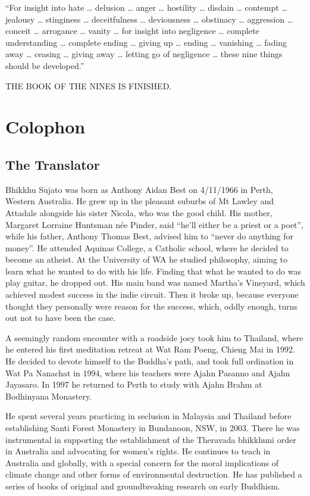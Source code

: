 \documentclass[12pt,openany]{book}%
\newcommand*{\scendbook}[1]{\begin{center}\uppercase{#1}\end{center}}
\let\oldbackmatter\backmatter
\renewcommand{\backmatter}{%
\chapterfont{\setstretch{.85}\normalfont\centering}%
\sectionfont{\setstretch{.85}\Semiboldsubheadfont}%
\oldbackmatter}
\begin{document}
“For insight into hate … delusion … anger … hostility … disdain … contempt … jealousy … stinginess … deceitfulness … deviousness … obstinacy … aggression … conceit … arrogance … vanity … for insight into negligence … complete understanding … complete ending … giving up … ending … vanishing … fading away … ceasing … giving away … letting go of negligence … these nine things should be developed.” 

\scendbook{The Book of the Nines is finished. }

%
\backmatter%
\chapter*{Colophon}

\section*{The Translator}

Bhikkhu Sujato was born as Anthony Aidan Best on 4/11/1966 in Perth, Western Australia. He grew up in the pleasant suburbs of Mt Lawley and Attadale alongside his sister Nicola, who was the good child. His mother, Margaret Lorraine Huntsman née Pinder, said “he’ll either be a priest or a poet”, while his father, Anthony Thomas Best, advised him to “never do anything for money”. He attended Aquinas College, a Catholic school, where he decided to become an atheist. At the University of WA he studied philosophy, aiming to learn what he wanted to do with his life. Finding that what he wanted to do was play guitar, he dropped out. His main band was named Martha’s Vineyard, which achieved modest success in the indie circuit. Then it broke up, because everyone thought they personally were reason for the success, which, oddly enough, turns out not to have been the case. 

A seemingly random encounter with a roadside joey took him to Thailand, where he entered his first meditation retreat at Wat Ram Poeng, Chieng Mai in 1992. He decided to devote himself to the Buddha’s path, and took full ordination in Wat Pa Nanachat in 1994, where his teachers were Ajahn Pasanno and Ajahn Jayasaro. In 1997 he returned to Perth to study with Ajahn Brahm at Bodhinyana Monastery. 

He spent several years practicing in seclusion in Malaysia and Thailand before establishing Santi Forest Monastery in Bundanoon, NSW, in 2003. There he was instrumental in supporting the establishment of the Theravada bhikkhuni order in Australia and advocating for women’s rights. He continues to teach in Australia and globally, with a special concern for the moral implications of climate change and other forms of environmental destruction. He has published a series of books of original and groundbreaking research on early Buddhism. 
\end{document}
